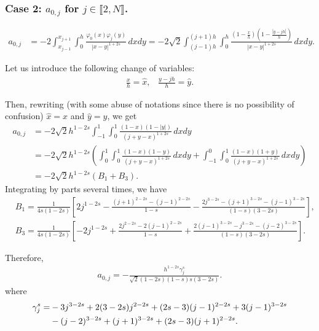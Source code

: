 \documentclass[10 pt]{article}
\newcommand\inter[1]{\llbracket #1\rrbracket}
\numberwithin{equation}{section}
\begin{document}
\subsubsection{Case 2: $a_{0,j}$ for $j\in\inter{2,N}$.}

\begin{align*}
	a_{0,j}&=-2 \int_{x_{j-1}}^{x_{j+1}}\int_{0}^{h}\frac{\varphi_0(x)\varphi_j(y)}{|x-y|^{1+2s}}\,dxdy
=-2\sqrt{2} \int_{(j-1)h}^{(j+1)h}\int_0^{h}\frac{\left(1-\frac{x}{h}\right)\left(1-\frac{|y-jh|}{h}\right)}{|x-y|^{1+2s}}\,dxdy.
\end{align*}

Let us introduce the following change of variables:
\begin{align*}
	\frac{x}{h}=\hat{x},\;\;\; \frac{y-jh}{h}=\hat{y}.
\end{align*}

Then, rewriting (with some abuse of notations since there is no possibility of confusion) $\hat{x}=x$ and $\hat{y}=y$, we get 
\begin{align*}%
	a_{0,j}&=-2\sqrt{2}h^{1-2s} \int_{-1}^1\int_{0}^1\frac{(1-x)(1-|y|)}{(j+y-x)^{1+2s}}\,dxdy\\
	&=-2\sqrt{2}h^{1-2s} \left(\int_{0}^1\int_{0}^1\frac{(1-x)(1-y)}{(j+y-x)^{1+2s}}\,dxdy
	+\int_{-1}^0\int_{0}^1\frac{(1-x)(1+y)}{(j+y-x)^{1+2s}}\,dxdy\right)\\
	&=-2\sqrt{2}h^{1-2s}(B_1+B_3).
\end{align*}
Integrating by parts several times, we have
\begin{align*}
	& B_1 = \frac{1}{4s(1-2s)}\left[2j^{1-2s}-\frac{(j+1)^{2-2s}-(j-1)^{2-2s}}{1-s}-\frac{2j^{3-2s}-(j+1)^{3-2s}-(j-1)^{3-2s}}{(1-s)(3-2s)}\right],\\
	& B_3 = \frac{1}{4s(1-2s)}\left[-2j^{1-2s}+\frac{2j^{2-2s}-2(j-1)^{2-2s}}{1-s}+\frac{2(j-1)^{3-2s}-j^{3-2s}-(j-2)^{3-2s}}{(1-s)(3-2s)}\right].
\end{align*} 

Therefore,
\begin{align*}
	a_{0,j} =-\frac{h^{1-2 s} \gamma_j^s }{\sqrt{2}(1-2 s) (1-s) s (3- 2s )}.
\end{align*} 
where
%
\begin{align}\notag
\gamma_j^s= &-3 j^{3-2 s}+2 (3-2 s) j^{2-2 s}+(2 s-3)
   (j-1)^{2-2 s}+3 (j-1)^{3-2 s} \\ \label{eq:def_gamma_j}
   &-(j-2)^{3-2 s}+(j+1)^{3-2 s}+(2
   s-3) (j+1)^{2-2 s}.
\end{align}
%
\end{document}
